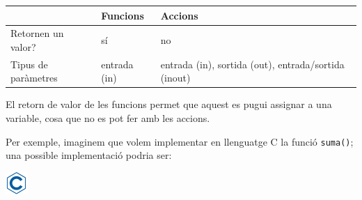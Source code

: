 \documentclass[
]{book}
\begin{document}
\begin{longtable}[]{@{}lll@{}}
\toprule
\begin{minipage}[b]{0.50\columnwidth}\raggedright
\strut
\end{minipage} & \begin{minipage}[b]{0.22\columnwidth}\raggedright
Funcions\strut
\end{minipage} & \begin{minipage}[b]{0.19\columnwidth}\raggedright
Accions\strut
\end{minipage}\tabularnewline
\midrule
\endhead
\begin{minipage}[t]{0.50\columnwidth}\raggedright
Retornen un valor?\strut
\end{minipage} & \begin{minipage}[t]{0.22\columnwidth}\raggedright
sí\strut
\end{minipage} & \begin{minipage}[t]{0.19\columnwidth}\raggedright
no\strut
\end{minipage}\tabularnewline
\begin{minipage}[t]{0.50\columnwidth}\raggedright
Tipus de paràmetres\strut
\end{minipage} & \begin{minipage}[t]{0.22\columnwidth}\raggedright
entrada (in)\strut
\end{minipage} & \begin{minipage}[t]{0.19\columnwidth}\raggedright
entrada (in), sortida (out), entrada/sortida (inout)\strut
\end{minipage}\tabularnewline
\bottomrule
\end{longtable}

El retorn de valor de les funcions permet que aquest es pugui assignar a una variable, cosa que no es pot fer amb les accions.

Per exemple, imaginem que volem implementar en llenguatge C la funció \texttt{suma()}; una possible implementació podria ser:

\includegraphics{./img/c.png}
\end{document}
